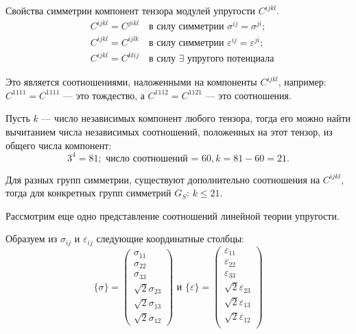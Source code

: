 
Свойства симметрии компонент тензора модулей упругости $C^{ijkl}$.
\begin{align*}
	&C^{ijkl} = C^{jikl} \quad \text{в силу симметрии $\sigma^{ij} = \sigma^{ji}$}; \\
	&C^{ijkl} = C^{ijlk} \quad \text{в силу симметрии $\varepsilon^{ij} = \varepsilon^{ji}$}; \\
	&C^{ijkl} = C^{klij} \quad \text{в силу $\exists$ упругого потенциала}
\end{align*}

Это является соотношениями, наложенными на компоненты $C^{ijkl}$, например: $C^{1111} = C^{1111}$ --- это тождество, а $C^{1112} = C^{1121}$ --- это соотношения.

Пусть $k$ --- число независимых компонент любого тензора, тогда его можно найти вычитанием числа независимых соотношений, положенных на этот тензор, из общего числа компонент:
\begin{equation*}
	3^{4} = 81; \text{ число соотношений = }60, k = 81 - 60 = 21.
\end{equation*}

Для разных групп симметрии, существуют дополнительно соотношения на $C^{ijkl}$, тогда для конкретных групп симметрий $G_S$: $k \leq 21$.

Рассмотрим еще одно представление соотношений линейной теории упругости.

Образуем из $\sigma_{ij}$ и $\varepsilon_{ij}$ следующие координатные столбцы:
\begin{equation*}
	\{\sigma\} = \begin{pmatrix}
		\sigma_{11} \\
		\sigma_{22} \\ 
		\sigma_{33} \\
		\sqrt{2} \sigma_{23} \\
		\sqrt{2} \sigma_{13} \\
		\sqrt{2} \sigma_{12}
	\end{pmatrix} \text{ и } \{\varepsilon\} = \begin{pmatrix}
		\varepsilon_{11} \\
		\varepsilon_{22} \\
		\varepsilon_{33} \\
		\sqrt{2}\varepsilon_{23} \\
		\sqrt{2}\varepsilon_{13} \\
		\sqrt{2}\varepsilon_{12} \\
	\end{pmatrix}
\end{equation*}

